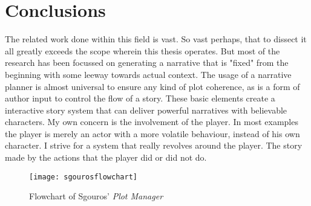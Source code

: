 \section{Conclusions}
The related work done within this field is vast.
So vast perhaps, that to dissect it all greatly exceeds the scope wherein this thesis operates.
But most of the research has been focussed on generating a narrative that is "fixed" from the beginning with some leeway towards actual context.
The usage of a narrative planner is almost universal to ensure any kind of plot coherence, as is a form of author input to control the flow of a story.
These basic elements create a interactive story system that can deliver powerful narratives with believable characters.
My own concern is the involvement of the player.
In most examples the player is merely an actor with a more volatile behaviour, instead of his own character.
I strive for a system that really revolves around the player.
The story made by the actions that the player did or did not do.

\begin{figure}[p]
	\texttt{[image: sgourosflowchart]}
	\caption{Flowchart of Sgouros' \textit{Plot Manager}}
	\label{fig:sgouros_flowchart}
\end{figure}



